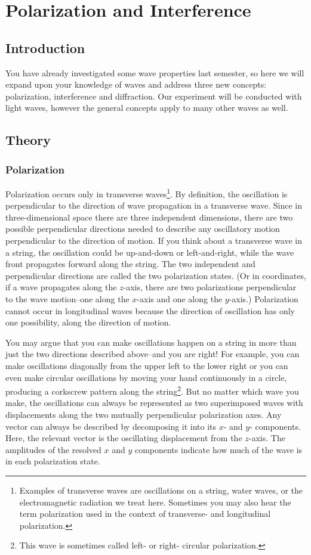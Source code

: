 \chapter{Polarization and Interference}
\section{Introduction}
You have already investigated some wave properties last semester, so here we will expand upon your knowledge of waves and address three new concepts: polarization, interference and diffraction. Our experiment will be conducted with light waves, however the general concepts apply to many other waves as well.

\section{Theory}
\subsection{Polarization}
Polarization occurs only in transverse waves\footnote{Examples of transverse waves are oscillations on a string, water waves, or the electromagnetic radiation we treat here. Sometimes you may also hear the term polarization used in the context of transverse- and longitudinal polarization.}. By definition, the oscillation is perpendicular to the direction of wave propagation in a transverse wave. Since in three-dimensional space there are three independent dimensions, there are two possible perpendicular directions needed to describe any oscillatory motion perpendicular to the direction of motion. If you think about a transverse wave in a string, the oscillation could be up-and-down or left-and-right, while the wave front propagates forward along the string. The two independent and perpendicular directions are called the two polarization states. (Or in coordinates, if a wave propagates along the $z$-axis, there are two polarizations perpendicular to the wave motion--one along the $x$-axis and one along the $y$-axis.) Polarization cannot occur in longitudinal waves because the direction of oscillation has only one possibility, along the direction of motion.\myskip

You may argue that you can make oscillations happen on a string in more than just the two directions described above--and you are right! For example, you can make oscillations diagonally from the upper left to the lower right or you can even make circular oscillations by moving your hand continuously in a circle, producing a corkscrew pattern along the string\footnote{This wave is sometimes called left- or right- circular polarization.}. But no matter which wave you make, the oscillations can always be represented as two superimposed waves with displacements along the two mutually perpendicular polarization axes. Any vector can always be described by decomposing it into its $x$- and $y$- components. Here, the relevant vector is the oscillating displacement from the $z$-axis. The amplitudes of the resolved $x$ and $y$ components indicate how much of the wave is in each polarization state.\myskip

